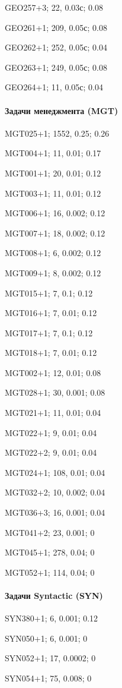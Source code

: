 GEO257+3; 22, 0.03с; 0.08

GEO261+1; 209, 0.05с; 0.08

GEO262+1; 252, 0.05с; 0.04

GEO263+1; 249, 0.05с; 0.08

GEO264+1; 11, 0.05с; 0.04


\paragraph{Задачи менеджмента (MGT)}

MGT025+1; 1552, 0.25; 0.26

MGT004+1; 11, 0.01; 0.17

MGT001+1; 20, 0.01; 0.12

MGT003+1; 11, 0.01; 0.12

MGT006+1; 16, 0.002; 0.12

MGT007+1; 18, 0.002; 0.12

MGT008+1; 6, 0.002; 0.12

MGT009+1; 8, 0.002; 0.12

MGT015+1; 7, 0.1; 0.12

MGT016+1; 7, 0.01; 0.12

MGT017+1; 7, 0.1; 0.12

MGT018+1; 7, 0.01; 0.12

MGT002+1; 12, 0.01; 0.08

MGT028+1; 30, 0.001; 0.08

MGT021+1; 11, 0.01; 0.04

MGT022+1; 9, 0.01; 0.04

MGT022+2; 9, 0.01; 0.04

MGT024+1; 108, 0.01; 0.04

MGT032+2; 10, 0.002; 0.04

MGT036+3; 16, 0.001; 0.04

MGT041+2; 23, 0.001; 0

MGT045+1; 278, 0.04; 0

MGT052+1; 114, 0.04; 0

\paragraph{Задачи Syntactic (SYN)}

SYN380+1; 6, 0.001; 0.12

SYN050+1; 6, 0.001; 0

SYN052+1; 17, 0.0002; 0

SYN054+1; 75, 0.008; 0

